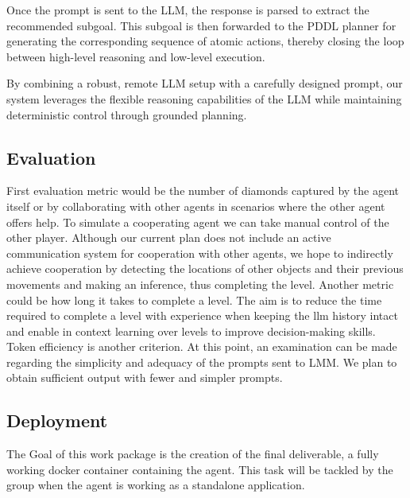 \documentclass{article}
\begin{document}
Once the prompt is sent to the LLM, the response is parsed to extract the recommended subgoal. This subgoal is then forwarded to the PDDL planner for generating the corresponding sequence of atomic actions, thereby closing the loop between high-level reasoning and low-level execution.

By combining a robust, remote LLM setup with a carefully designed prompt, our system leverages the flexible reasoning capabilities of the LLM while maintaining deterministic control through grounded planning.



\subsection{Evaluation}
First evaluation metric would be the number of diamonds captured by the agent itself or by collaborating with other agents in scenarios where the other agent offers help.
To simulate a cooperating agent we can take manual control of the other player.
Although our current plan does not include an active communication system for cooperation with other agents, we hope to indirectly achieve cooperation by detecting the locations of other objects and their previous movements and making an inference, thus completing the level.
Another metric could be how long it takes to complete a level. The aim is to reduce the time required to complete a level with experience when keeping the llm history intact and enable in context learning over levels to improve decision-making skills. 
Token efficiency is another criterion. At this point, an examination can be made regarding the simplicity and adequacy of the prompts sent to LMM. 
We plan to obtain sufficient output with fewer and simpler prompts. 


\subsection{Deployment}
The Goal of this work package is the creation of the final deliverable, a fully working docker container containing the agent. 
This task will be tackled by the group when the agent is working as a standalone application.
\end{document}
